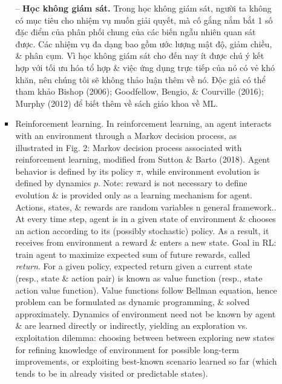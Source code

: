 \documentclass{article}
\begin{document}
\begin{itemize}
\begin{itemize}
\begin{itemize}
            -- {\bf Học không giám sát.} Trong học không giám sát, người ta không có mục tiêu cho nhiệm vụ muốn giải quyết, mà cố gắng nắm bắt 1 số đặc điểm của phân phối chung của các biến ngẫu nhiên quan sát được. Các nhiệm vụ đa dạng bao gồm ước lượng mật độ, giảm chiều, \& phân cụm. Vì học không giám sát cho đến nay ít được chú ý kết hợp với tối ưu hóa tổ hợp \& việc ứng dụng trực tiếp của nó có vẻ khó khăn, nên chúng tôi sẽ không thảo luận thêm về nó. Độc giả có thể tham khảo Bishop (2006); Goodfellow, Bengio, \& Courville (2016); Murphy (2012) để biết thêm về sách giáo khoa về ML.
            \item {\sf Reinforcement learning.} In reinforcement learning, an agent interacts with an environment through a Markov decision process, as illustrated in {\sf Fig. 2: Markov decision process associated with reinforcement learning, modified from Sutton \& Barto (2018). Agent behavior is defined by its policy $\pi$, while environment evolution is defined by dynamics $p$. Note: reward is not necessary to define evolution \& is provided only as a learning mechanism for agent. Actions, states, \& rewards are random variables n general framework.}. At every time step, agent is in a given state of environment \& chooses an action according to its (possibly stochastic) policy. As a result, it receives from environment a reward \& enters a new state. Goal in RL: train agent to maximize expected sum of future rewards, called {\it return}. For a given policy, expected return given a current state (resp., state \& action pair) is known as value function (resp., state action value function). Value functions follow Bellman equation, hence problem can be formulated as dynamic programming, \& solved approximately. Dynamics of environment need not be known by agent \& are learned directly or indirectly, yielding an exploration vs. exploitation dilemma: choosing between between exploring new states for refining knowledge of environment for possible long-term improvements, or exploiting best-known scenario learned so far (which tends to be in already visited or predictable states).


\end{itemize}
\end{itemize}
\end{itemize}
\end{document}
